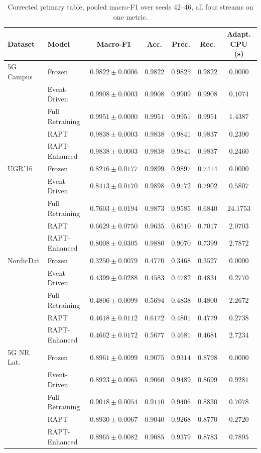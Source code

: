 \begin{table}[t]
\caption{Corrected primary table, pooled macro-F1 over seeds 42--46, all four streams on one metric.}
\label{tab:primary_pool}
\centering
\scriptsize
\begin{tabular}{@{}llccccc@{}}
\toprule
\textbf{Dataset} & \textbf{Model} & \textbf{Macro-F1} & \textbf{Acc.} & \textbf{Prec.} & \textbf{Rec.} & \textbf{Adapt. CPU (s)} \\
\midrule
5G Campus & Frozen & $0.9822 \pm 0.0006$ & $0.9822$ & $0.9825$ & $0.9822$ & $0.0000$ \\
 & Event-Driven & $0.9908 \pm 0.0003$ & $0.9908$ & $0.9909$ & $0.9908$ & $0.1074$ \\
 & Full Retraining & $0.9951 \pm 0.0000$ & $0.9951$ & $0.9951$ & $0.9951$ & $1.4387$ \\
 & RAPT & $0.9838 \pm 0.0003$ & $0.9838$ & $0.9841$ & $0.9837$ & $0.2390$ \\
 & RAPT-Enhanced & $0.9838 \pm 0.0003$ & $0.9838$ & $0.9841$ & $0.9837$ & $0.2460$ \\
\midrule
UGR'16 & Frozen & $0.8216 \pm 0.0177$ & $0.9899$ & $0.9897$ & $0.7414$ & $0.0000$ \\
 & Event-Driven & $0.8413 \pm 0.0170$ & $0.9898$ & $0.9172$ & $0.7902$ & $0.5807$ \\
 & Full Retraining & $0.7603 \pm 0.0194$ & $0.9873$ & $0.9585$ & $0.6840$ & $24.1753$ \\
 & RAPT & $0.6629 \pm 0.0750$ & $0.9635$ & $0.6510$ & $0.7017$ & $2.0703$ \\
 & RAPT-Enhanced & $0.8008 \pm 0.0305$ & $0.9880$ & $0.9070$ & $0.7399$ & $2.7872$ \\
\midrule
NordicDat & Frozen & $0.3250 \pm 0.0079$ & $0.4770$ & $0.3468$ & $0.3527$ & $0.0000$ \\
 & Event-Driven & $0.4399 \pm 0.0288$ & $0.4583$ & $0.4782$ & $0.4831$ & $0.2770$ \\
 & Full Retraining & $0.4806 \pm 0.0099$ & $0.5694$ & $0.4838$ & $0.4800$ & $2.2672$ \\
 & RAPT & $0.4618 \pm 0.0112$ & $0.6172$ & $0.4801$ & $0.4779$ & $0.2738$ \\
 & RAPT-Enhanced & $0.4662 \pm 0.0172$ & $0.5677$ & $0.4681$ & $0.4681$ & $2.7234$ \\
\midrule
5G NR Lat. & Frozen & $0.8961 \pm 0.0099$ & $0.9075$ & $0.9314$ & $0.8798$ & $0.0000$ \\
 & Event-Driven & $0.8923 \pm 0.0065$ & $0.9060$ & $0.9489$ & $0.8699$ & $0.9281$ \\
 & Full Retraining & $0.9018 \pm 0.0054$ & $0.9110$ & $0.9406$ & $0.8830$ & $0.7078$ \\
 & RAPT & $0.8930 \pm 0.0067$ & $0.9040$ & $0.9268$ & $0.8770$ & $0.2720$ \\
 & RAPT-Enhanced & $0.8965 \pm 0.0082$ & $0.9085$ & $0.9379$ & $0.8783$ & $0.7895$ \\
\bottomrule
\end{tabular}
\end{table}
